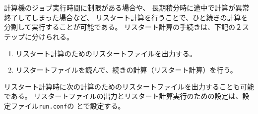 \section{\SecAdvanceRestart}\label{sec:restart}

計算機のジョブ実行時間に制限がある場合や、
長期積分時に途中で計算が異常終了してしまった場合など、
リスタート計算を行うことで、ひと続きの計算を分割して実行することが可能である。
リスタート計算の手続きは、下記の２ステップに分けられる。
\begin{enumerate}
\item リスタート計算のためのリスタートファイルを出力する。
\item リスタートファイルを読んで、続きの計算（リスタート計算）を行う。
\end{enumerate}
リスタート計算時に次の計算のためのリスタートファイルを出力することも可能である。
リスタートファイルの出力とリスタート計算実行のための設定は、設定ファイル\verb|run.conf|の
とで設定する。\\

